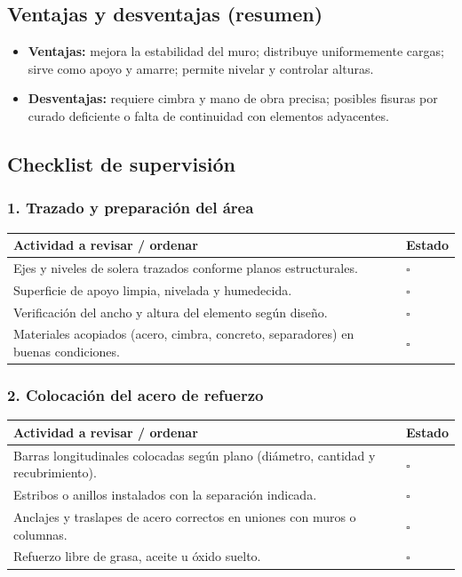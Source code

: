 \documentclass[12pt]{article}
\newcommand{\cbox}{\(\square\)}
\renewcommand{\cbox}{\(\square\)} %
\begin{document}
	\subsection*{Ventajas y desventajas (resumen)}
	\begin{itemize}[leftmargin=*, itemsep=2pt]
		\item \textbf{Ventajas:} mejora la estabilidad del muro; distribuye uniformemente cargas; sirve como apoyo y amarre; permite nivelar y controlar alturas.
		\item \textbf{Desventajas:} requiere cimbra y mano de obra precisa; posibles fisuras por curado deficiente o falta de continuidad con elementos adyacentes.
	\end{itemize}
	
	\subsection{Checklist de supervisión}
	
	\subsubsection*{1. Trazado y preparación del área}
	\begin{tabularx}{\linewidth}{>{\raggedright\arraybackslash}p{0.93\linewidth} >{\centering\arraybackslash}m{0.07\linewidth}}
		\toprule
		\textbf{Actividad a revisar / ordenar} & \textbf{Estado}\\
		\midrule
		Ejes y niveles de solera trazados conforme planos estructurales. & \cbox \\
		Superficie de apoyo limpia, nivelada y humedecida. & \cbox \\
		Verificación del ancho y altura del elemento según diseño. & \cbox \\
		Materiales acopiados (acero, cimbra, concreto, separadores) en buenas condiciones. & \cbox \\
		\bottomrule
	\end{tabularx}
	
	\subsubsection*{2. Colocación del acero de refuerzo}
	\begin{tabularx}{\linewidth}{>{\raggedright\arraybackslash}p{0.93\linewidth} >{\centering\arraybackslash}m{0.07\linewidth}}
		\toprule
		\textbf{Actividad a revisar / ordenar} & \textbf{Estado}\\
		\midrule
		Barras longitudinales colocadas según plano (diámetro, cantidad y recubrimiento). & \cbox \\
		Estribos o anillos instalados con la separación indicada. & \cbox \\
		Anclajes y traslapes de acero correctos en uniones con muros o columnas. & \cbox \\
		Refuerzo libre de grasa, aceite u óxido suelto. & \cbox \\
		\bottomrule
	\end{tabularx}
	
\end{document}
